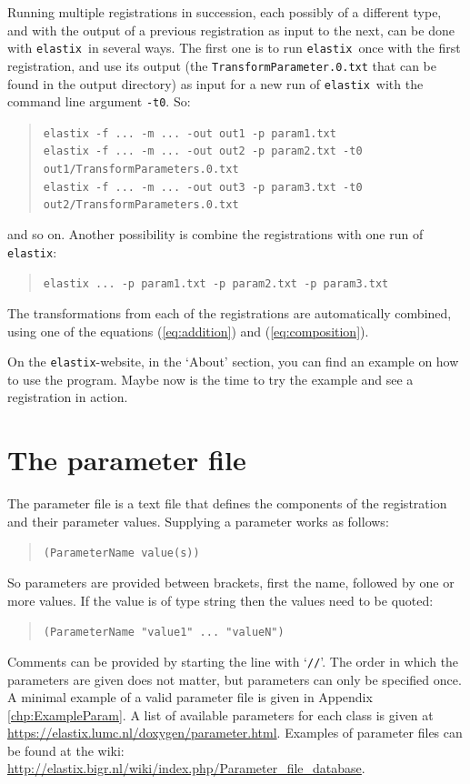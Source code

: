 \documentclass[]{report}
\newcommand{\elastix}{\texttt{elastix}}
\begin{document}
Running multiple registrations in succession, each possibly of a
different type, and with the output of a previous registration as
input to the next, can be done with \elastix\ in several ways. The
first one is to run \elastix\ once with the first registration, and
use its output (the \texttt{TransformParameter.0.txt} that can be
found in the output directory) as input for a new run of \elastix\
with the command line argument \texttt{-t0}. So:
\begin{quote}
\texttt{elastix -f ... -m ... -out out1 -p param1.txt} \\
\texttt{elastix -f ... -m ... -out out2 -p param2.txt -t0
out1/TransformParameters.0.txt} \\
\texttt{elastix -f ... -m ... -out out3 -p param3.txt -t0
out2/TransformParameters.0.txt}
\end{quote}
and so on. Another possibility is combine the registrations with one
run of \elastix:
\begin{quote}
\texttt{elastix ... -p param1.txt -p param2.txt -p param3.txt}
\end{quote}
The transformations from each of the registrations are automatically
combined, using one of the equations (\ref{eq:addition}) and
(\ref{eq:composition}).

On the \elastix-website, in the `About' section, you can find an
example on how to use the program. Maybe now is the time to try
the example and see a registration in action.


\section{The parameter file}\label{sec:elastix:param}

The parameter file is a text file that defines the components of the
registration and their parameter values. Supplying a parameter works
as follows:
\begin{quote}
\texttt{(ParameterName value(s))}
\end{quote}
So parameters are provided between brackets, first the name,
followed by one or more values. If the value is of type string then
the values need to be quoted:
\begin{quote}
\texttt{(ParameterName "value1" ... "valueN")}
\end{quote}
Comments can be provided by starting the line with `\texttt{//}'.
The order in which the parameters are given does not matter, but
parameters can only be specified once. A minimal example of a valid
parameter file is given in Appendix \ref{chp:ExampleParam}. A list
of available parameters for each class is given at
\url{https://elastix.lumc.nl/doxygen/parameter.html}. Examples of
parameter files can be found at the wiki:
\url{http://elastix.bigr.nl/wiki/index.php/Parameter_file_database}.
\end{document}
